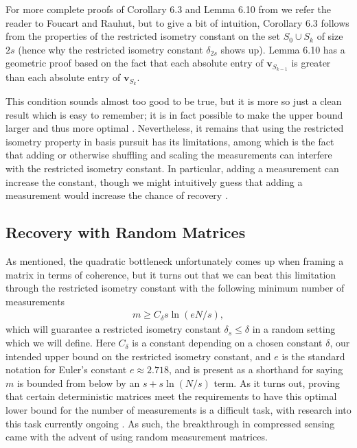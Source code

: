 \documentclass[12pt,a4paper]{amsart}
\numberwithin{equation}{section}
\theoremstyle{plain}
\theoremstyle{definition}
\newcommand{\bdv}{\mathbf{v}}
\begin{document}
For more complete proofs of Corollary 6.3 and Lemma 6.10 from \cite{fou-rau} we refer the reader to Foucart and Rauhut, but to give a bit of intuition, Corollary 6.3 follows from the properties of the restricted isometry constant on the set $S_0\cup S_k$ of size $2s$ (hence why the restricted isometry constant $\delta_{2s}$ shows up). Lemma 6.10 has a geometric proof based on the fact that each absolute entry of $\bdv_{S_{k-1}}$ is greater than each absolute entry of $\bdv_{S_k}$.

This condition sounds almost too good to be true, but it is more so just a clean result which is easy to remember; it is in fact possible to make the upper bound larger and thus more optimal \cite{fou-rau}. Nevertheless, it remains that using the restricted isometry property in basis pursuit has its limitations, among which is the fact that adding or otherwise shuffling and scaling the measurements can interfere with the restricted isometry constant. In particular, adding a measurement can increase the constant, though we might intuitively guess that adding a measurement would increase the chance of recovery \cite{fou-rau}.

\subsection{Recovery with Random Matrices}\label{random-matrix}

As mentioned, the quadratic bottleneck unfortunately comes up when framing a matrix in terms of coherence, but it turns out that we can beat this limitation through the restricted isometry constant with the following minimum number of measurements \begin{align*} m\geq C_\delta s\ln(eN/s),\end{align*} which will guarantee a restricted isometry constant $\delta_s\leq\delta$ in a random setting which we will define. Here $C_\delta$ is a constant depending on a chosen constant $\delta$, our intended upper bound on the restricted isometry constant, and $e$ is the standard notation for Euler's constant $e\approx2.718$, and is present as a shorthand for saying $m$ is bounded from below by an $s+s\ln(N/s)$ term. As it turns out, proving that certain deterministic matrices meet the requirements to have this optimal lower bound for the number of measurements is a difficult task, with research into this task currently ongoing \cite{fou-rau}. As such, the breakthrough in compressed sensing came with the advent of using random measurement matrices. 
\end{document}
